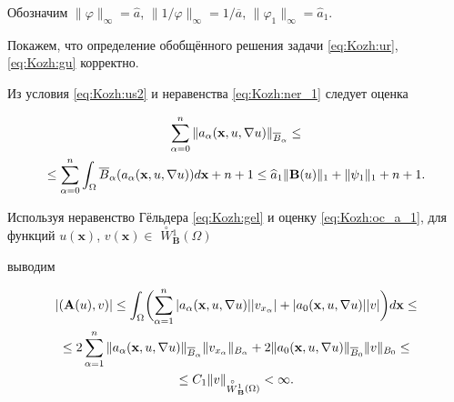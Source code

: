 \smallskip




Обозначим \linebreak $\|\varphi\|_{\infty}=\widehat{a}$, $\|1/\varphi\|_{\infty}=1/\overline{a}$, $\|\varphi_1\|_{\infty}=\widehat{a}_1$.

Покажем, что определение обобщённого решения задачи \eqref{eq:Kozh:ur}, \eqref{eq:Kozh:gu} корректно.

 Из условия  \eqref{eq:Kozh:us2} и неравенства \eqref{eq:Kozh:ner_1} следует оценка

\begin{multline}\label{eq:Kozh:oc_a_1}

\sum_{\alpha=0}^n\|a_\alpha({\bf x},u,\nabla u)\|_{\overline{B}_{\alpha}}\leq

\\

\leq\sum_{\alpha=0}^n\int_{\Omega}\overline{B}_{\alpha}(a_\alpha({\bf x},u,\nabla u))d{\bf x}+n+1\leq \widehat{a}_1\|\mathbf{B}(u)\|_{1}+\|\psi_1\|_{1}+n+1.

\end{multline}



Используя неравенство Гёльдера \eqref{eq:Kozh:gel} и оценку \eqref{eq:Kozh:oc_a_1}, для функций $u(\mathbf{x})$, $v(\mathbf{x})\in$ $

\stackrel {\circ} {W}\!{}^{1}_{\mathbf{B}} (\Omega)$

выводим

\begin{multline}\label{eq:Kozh:opr1_1}

|(\mathbf{A}(u),v)|\leq\int_{\Omega}

\biggl(\sum_{\alpha=1}^n|a_\alpha({\bf x},u,\nabla

u)||v_{x_\alpha}|+|a_0({\bf x},u,\nabla u)||v|\biggr)d{\bf x}\leq

\\

\leq2\sum_{\alpha=1}^n\|a_\alpha({\bf x},u,\nabla u)\|_{\overline{B}_{\alpha}}\|v_{x_\alpha}\|_{{B}_{\alpha}}+2\|a_0({\bf x},u,\nabla u)\|_{\overline{B}_0}\|v\|_{{B}_0}\leq \\ \leq C_1\|v\|_{\stackrel {\circ}

{W}{}_{\bf B}^{1}(\Omega)}<\infty.

\end{multline}

